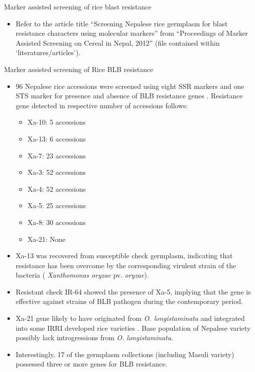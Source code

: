 \documentclass[11pt,dvipsnames,ignorenonframetext,aspectratio=169]{beamer}
\providecommand{\tightlist}{%
  \setlength{\itemsep}{0pt}\setlength{\parskip}{0pt}}
\begin{document}
\begin{frame}{Marker assisted screening of rice blast resistance}
\protect\hypertarget{marker-assisted-screening-of-rice-blast-resistance}{}
\begin{itemize}
\tightlist
\item
  Refer to the article title ``Screening Nepalese rice germplasm for
  blast resistance characters using molecular markers'' from
  ``Proceedings of Marker Assisted Screening on Cereal in Nepal, 2012''
  (file contained within `literatures/articles').
\end{itemize}
\end{frame}

\begin{frame}{Marker assisted screening of Rice BLB resistance}
\protect\hypertarget{marker-assisted-screening-of-rice-blb-resistance}{}
\footnotesize

\begin{itemize}
\tightlist
\item
  96 Nepalese rice accessions were screened using eight SSR markers and
  one STS marker for presence and absence of BLB resistance genes
  \citep{amgai2015marker}. Resistance gene detected in respective number
  of accessions follows:

  \begin{itemize}
  \scriptsize
  \item Xa-10: 5 accessions
  \item Xa-13: 6 accessions
  \item Xa-7: 23 accessions
  \item Xa-3: 52 accessions
  \item Xa-4: 52 accessions
  \item Xa-5: 25 accessions
  \item Xa-8: 30 accessions
  \item Xa-21: None
  \end{itemize}
\item
  Xa-13 was recovered from susceptible check germplasm, indicating that
  resistance has been overcome by the corresponding virulent strain of
  the bacteria ( \emph{Xanthomonas oryzae} pv. \emph{oryzae}).
\end{itemize}
\end{frame}

\begin{frame}{}
\protect\hypertarget{section-4}{}
\small

\begin{itemize}
\tightlist
\item
  Resistant check IR-64 showed the presence of Xa-5, implying that the
  gene is effective against strains of BLB pathogen during the
  contemporary period.
\item
  Xa-21 gene likely to have originated from \emph{O. longistaminata} and
  integrated into some IRRI developed rice varieties \citep{rao2002dna}.
  Base population of Nepalese variety possibly lack introgressions from
  \emph{O. longistaminata}.
\item
  Interestingly, 17 of the germplasm collections (including Masuli
  variety) possessed three or more genes for BLB resistance.
\end{itemize}
\end{frame}
\end{document}

